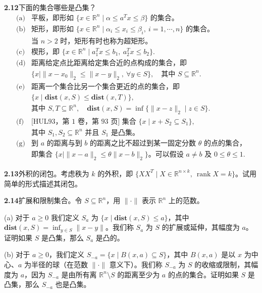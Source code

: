 \documentclass[UTF8,12pt,a4paper,fontset=fandol]{ctexart}
\begin{document}
\noindent\textbf{2.12}\quad 下面的集合哪些是凸集？
\[
  \begin{array}{ll}
  \text{(a)} & \text{平板，即形如 }\{x\in\mathbb{R}^n\mid \alpha\le a^Tx\le\beta\}\text{ 的集合。}\\[0.3em]
  \text{(b)} & \text{矩形，即形如 }\{x\in\mathbb{R}^n\mid \alpha_i\le x_i\le\beta_i,\ i=1,\cdots,n\}\text{ 的集合。}\\
  & \text{当 }n>2\text{ 时，矩形有时也称为超矩形。}\\[0.3em]
  \text{(c)} & \text{楔形，即 }\{x\in\mathbb{R}^n\mid a_1^Tx\le b_1,\ a_2^Tx\le b_2\}.\\[0.3em]
  \text{(d)} & \text{距离给定点比距离给定集合近的点构成的集合，即}\\
  & \{x\mid \|x-x_0\|_2\le\|x-y\|_2,\ \forall y\in S\},\quad \text{其中 }S\subseteq\mathbb{R}^n.\\[0.3em]
  \text{(e)} & \text{距离一个集合比另一个集合更近的点的集合，即}\\
  & \{x\mid \mathbf{dist}(x,S)\le\mathbf{dist}(x,T)\},\\
  & \text{其中 }S,T\subseteq\mathbb{R}^n,\quad
    \mathbf{dist}(x,S)=\inf\{\|x-z\|_2\mid z\in S\}.\\[0.3em]
  \text{(f)} & \text{[HUL93，第 1 卷，第 93 页] 集合 }\{x\mid x+S_2\subseteq S_1\},\\
  & \text{其中 }S_1,S_2\subseteq\mathbb{R}^n\text{ 并且 }S_1\text{ 是凸集。}\\[0.3em]
  \text{(g)} & \text{到 }a\text{ 的距离与到 }b\text{ 的距离之比不超过到某一固定分数 }\theta\text{ 的点的集合，}\\
  & \text{即集合 }\{x\mid \|x-a\|_2\le\theta\|x-b\|_2\}\text{。可以假设 }a\ne b\text{ 及 }0\le\theta\le1.
  \end{array}
\]

\noindent\textbf{2.13}\quad 外积的闭包。考虑秩为 $k$ 的外积，即 $\{XX^T\mid X\in\mathbb{R}^{n\times k},\ \operatorname{rank}X=k\}$。试用简单的形式描述其闭包。

\noindent\textbf{2.14}\quad 扩展和限制集合。令 $S\subseteq\mathbb{R}^n$，用 $\|\cdot\|$ 表示 $\mathbb{R}^n$ 上的范数。

\noindent(a) 对于 $a\ge0$ 我们定义 $S_a$ 为 $\{x\mid \mathbf{dist}(x,S)\le a\}$，其中 $\mathbf{dist}(x,S)=\inf_{y\in S}\|x-y\|$。我们称 $S_a$ 为 $S$ 的扩展或延伸，其幅度为 $a$。证明如果 $S$ 是凸集，那么 $S_a$ 是凸的。

\noindent(b) 对于 $a\ge0$，我们定义 $S_{-a}=\{x\mid B(x,a)\subseteq S\}$，其中 $B(x,a)$ 是以 $x$ 为中心、$a$ 为半径的球（在范数 $\|\cdot\|$ 意义下）。我们称 $S_{-a}$ 为 $S$ 的收缩或限制，其幅度为 $a$，因为 $S_{-a}$ 是由所有离 $\mathbb{R}^n\setminus S$ 的距离至少为 $a$ 的点的集合。证明如果 $S$ 是凸集，那么 $S_{-a}$ 也是凸集。
\end{document}
